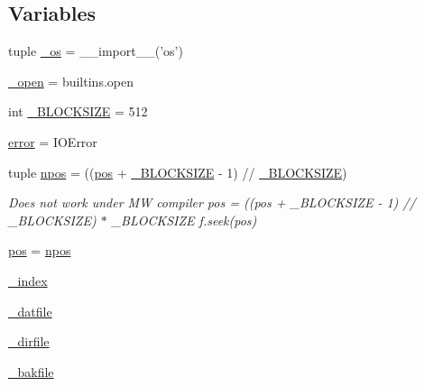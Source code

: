 \subsection*{Variables}
\begin{DoxyCompactItemize}
\item 
tuple \hyperlink{namespacescipy_1_1weave_1_1__dumbdbm__patched_a415565342c261404825ab9ce71ab1051}{\+\_\+os} = \+\_\+\+\_\+import\+\_\+\+\_\+('os')
\item 
\hyperlink{namespacescipy_1_1weave_1_1__dumbdbm__patched_ae0dd470130d4730acd3218a5399953ce}{\+\_\+open} = builtins.\+open
\item 
int \hyperlink{namespacescipy_1_1weave_1_1__dumbdbm__patched_ac459abcb253be327d15c725c339409f9}{\+\_\+\+B\+L\+O\+C\+K\+S\+I\+Z\+E} = 512
\item 
\hyperlink{namespacescipy_1_1weave_1_1__dumbdbm__patched_a262171467c520311c454ae78c7b455f4}{error} = I\+O\+Error
\item 
tuple \hyperlink{namespacescipy_1_1weave_1_1__dumbdbm__patched_a3be926cb63ddd985ee8f94a294dbe98d}{npos} = ((\hyperlink{namespacescipy_1_1weave_1_1__dumbdbm__patched_a67002c7d55ca53b9ff040655dea874ab}{pos} + \hyperlink{namespacescipy_1_1weave_1_1__dumbdbm__patched_ac459abcb253be327d15c725c339409f9}{\+\_\+\+B\+L\+O\+C\+K\+S\+I\+Z\+E} -\/ 1) // \hyperlink{namespacescipy_1_1weave_1_1__dumbdbm__patched_ac459abcb253be327d15c725c339409f9}{\+\_\+\+B\+L\+O\+C\+K\+S\+I\+Z\+E})
\begin{DoxyCompactList}\small\item\em Does not work under M\+W compiler pos = ((pos + \+\_\+\+B\+L\+O\+C\+K\+S\+I\+Z\+E -\/ 1) // \+\_\+\+B\+L\+O\+C\+K\+S\+I\+Z\+E) $\ast$ \+\_\+\+B\+L\+O\+C\+K\+S\+I\+Z\+E f.\+seek(pos) \end{DoxyCompactList}\item 
\hyperlink{namespacescipy_1_1weave_1_1__dumbdbm__patched_a67002c7d55ca53b9ff040655dea874ab}{pos} = \hyperlink{namespacescipy_1_1weave_1_1__dumbdbm__patched_a3be926cb63ddd985ee8f94a294dbe98d}{npos}
\item 
\hyperlink{namespacescipy_1_1weave_1_1__dumbdbm__patched_a53e0ca2099169c9b0a3d1bae9342c1d3}{\+\_\+index}
\item 
\hyperlink{namespacescipy_1_1weave_1_1__dumbdbm__patched_a2731787460f3503c78320bfb514acedc}{\+\_\+datfile}
\item 
\hyperlink{namespacescipy_1_1weave_1_1__dumbdbm__patched_a279c6309cac807cc7e6615b16f2008ac}{\+\_\+dirfile}
\item 
\hyperlink{namespacescipy_1_1weave_1_1__dumbdbm__patched_a40801479869bca3dcc3c663667fa4867}{\+\_\+bakfile}
\end{DoxyCompactItemize}


